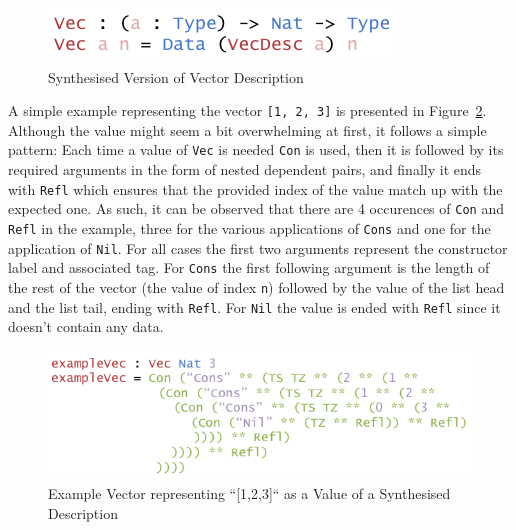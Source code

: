 \documentclass{ituthesis}
\newcommand{\ttconstructor}[1]{\textcolor{constructor-color}{\texttt{#1}}}
\newcommand{\tttype}[1]{\textcolor{type-color}{\texttt{#1}}}
\newcommand{\ttdec}[1]{\textcolor{declared-var-color}{\texttt{#1}}}
\newcommand{\ttvar}[1]{\textcolor{local-var-color}{\texttt{#1}}}
\newcommand{\ttliteral}[1]{\textcolor{literal-color}{\texttt{#1}}}
\begin{document}
\begin{figure}[ht]
\begin{center}
    \includegraphics[scale=0.5]{Figures/VectorSynthesisedDesc.png}
\end{center}
\caption{Synthesised Version of Vector Description}
\label{fig:synthversvecdesc}
\end{figure}

A simple example representing the vector \ttliteral{[1, 2, 3]} is presented in Figure~\ref{fig:exmvecsynthvecdesc}. Although the value might seem a bit overwhelming at first, it follows a simple pattern:
Each time a value of \ttdec{Vec} is needed \ttconstructor{Con} is used, then it is followed by its required arguments in the form of nested dependent pairs, and finally it ends with \tttype{Refl} which ensures
that the provided index of the value match up with the expected one.
As such, it can be observed that there are 4 occurences of \ttconstructor{Con} and \ttconstructor{Refl} in the example, three for the various applications
of \ttconstructor{Cons} and one for the application of \ttconstructor{Nil}. For all cases the first two arguments represent the constructor label and associated tag. 
For \ttconstructor{Cons} the first following argument is the length of the rest of the vector (the value of index \ttvar{n}) followed by the value of the list head and the list tail, ending with \tttype{Refl}.
For \ttconstructor{Nil} the value is ended with \ttconstructor{Refl} since it doesn't contain any data.


\begin{figure}[ht]
\begin{center}
    \includegraphics[scale=0.5]{Figures/VectorSynthesisedExample.png}
\end{center}
\caption{Example Vector representing ``[1,2,3]`` as a Value of a Synthesised Description}
\label{fig:exmvecsynthvecdesc}
\end{figure}
\end{document}
